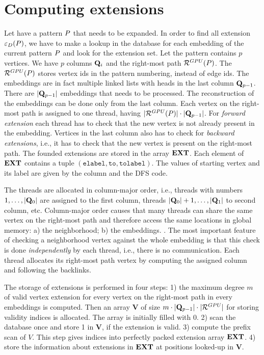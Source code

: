 \section{Computing extensions}\label{sec:computing-extension}

Let have a pattern $P$ that needs to be expanded. In order to
find all extension $\varepsilon_{D}(P)$, we have to make a lookup
in the database for each embedding of the current pattern $P$
and look for the extension set. Let the pattern contains $p$
vertices. We have $p$ columns $\mathbf{Q}_i$ and the right-most path
$\mathcal{R}^{GPU}(P)$. The $\mathcal{R}^{GPU}(P)$ stores vertex
ids in the pattern numbering, instead of edge ids. The embeddings are
in fact multiple linked lists with heads in the last column
$\mathbf{Q}_{p-1}$. There are $|\mathbf{Q}_{p-1}|$ embeddings that needs
to be processed. The reconstruction of the embeddings can be done only
from the last column. Each vertex on the right-most path is assigned
to one thread, having $|\mathcal{R}^{GPU}(P)| \cdot
|\mathbf{Q}_{p-1}|$. For \emph{forward extension} each thread has to
check that the new vertex is not already present in the
embedding. Vertices in the last column also has to check for
\emph{backward extensions}, i.e., it has to check that the new vertex
is present on the right-most path.  The founded extensions are stored
in the array $\mathbf{EXT}$. Each element of $\mathbf{EXT}$
contains a tuple $(\texttt{elabel}, \texttt{to},
\texttt{tolabel})$. The values of starting vertex and its label are
given by the column and the DFS code.


The threads are allocated in column-major order, i.e., threads with
numbers $1,\ldots, |\mathbf{Q}_{0}|$ are assigned to the first column,
threads $|\mathbf{Q}_{0}|+1,\ldots, |\mathbf{Q}_{1}|$ to second column,
etc.  Column-major order causes that many threads can share the same
vertex on the right-most path and therefore access the same locations
in global memory: a) the neighborhood; b) the
embeddings. .  The most important feature of checking a neighborhood vertex
against the whole embedding is that this check is done
\emph{independently} by each thread, i.e., there is no
communication. Each thread allocates its right-most path vertex by
computing the assigned column and following the backlinks.


The storage of extensions is performed in four steps: 1) the maximum
degree $m$ of valid vertex extension for every vertex on the
right-most path in every embeddings is computed. Then an array
$\mathbf{V}$ of size $m\cdot |\mathbf{Q}_{p-1}| \cdot |\mathcal{R}^{GPU}|$
for storing validity indices is allocated. The array is initially
filled with 0. 2) scan the database once and store 1 in $\mathbf{V}$,
if the extension is valid. 3) compute the prefix scan of $V$. This
step gives indices into perfectly packed extension array
$\mathbf{EXT}$. 4) store the information about extensions in
$\mathbf{EXT}$ at positions looked-up in $\mathbf{V}$.

